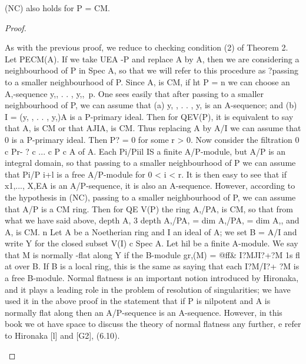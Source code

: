 \begin{theorem}[Theorem 24.5]\label{mcrt-auto-theorem-24-5}\uses{}
\begin{mathematicalrecord}
(NC) also holds for P = CM.
\end{mathematicalrecord}
\end{theorem}
\begin{proof}
\begin{mathematicalrecord}
As with the previous proof, we reduce to checking condition (2)
 of Theorem 2. Let PECM(A).             If we take UEA -P and replace A by A,
 then we are considering a neighbourhood           of P in Spec A, so that we will
 refer to this procedure as ?passing to a smaller neighbourhood of P. Since
 A, is CM, if ht P = n we can choose an A,-sequence y,, . . , y,,~p. One
 sees easily that after passing to a smaller neighbourhood           of P, we can
 assume that
    (a) y, , . . , y, is an A-sequence; and
    (b) I = (y, , . . , y,)A is a P-primary ideal.
Then for QEV(P), it is equivalent to say that A, is CM or that AJIA,
is CM. Thus replacing A by A/I we can assume that 0 is a P-primary ideal.
Then P? = 0 for some r > 0. Now consider the filtration 0 c Pr- ? c ... c
P c A of A. Each Pi/Piil IS a finite A/P-module, but A/P is an integral
domain, so that passing to a smaller neighbourhood           of P we can assume
that Pi/P i+l is a free A/P-module for 0 < i < r. It is then easy to see that
if x1,..., X,EA is an A/P-sequence, it is also an A-sequence. However,
according to the hypothesis in (NC), passing to a smaller neighbourhood
of P, we can assume that A/P is a CM ring. Then for QE V(P) the ring
A,/PA,      is CM, so that from what we have said above,
           depth A, 3 depth A,/PA, = dim A,/PA, = dim A,,
and A, is CM.      n
   Let A be a Noetherian ring and I an ideal of A; we set B = A/I and
write Y for the closed subset V(I) c Spec A. Let hil be a finite A-module.
We say that M is normally -flat along Y if the B-module gr,(M) =
 @ff& I?MJI?+?M      1s fl at over B. If B is a local ring, this is the same as
saying that each I?M/I?+ ?M is a free B-module. Normal flatness is an
important notion introduced by Hironaka, and it plays a leading role in
the problem of resolution of singularities; we have used it in the above
proof in the statement that if P is nilpotent and A is normally flat along
then an A/P-sequence is an A-sequence. However, in this book we
         ot have space to discuss the theory of normal flatness any further,
           e refer to Hironaka [l] and [G2], (6.10).
\end{mathematicalrecord}
\end{proof}


